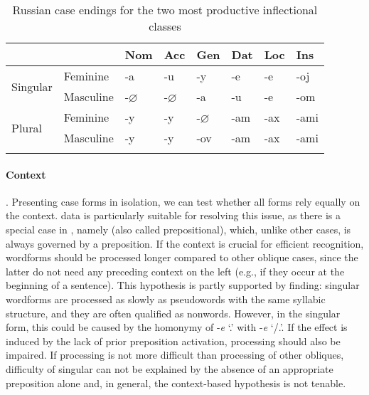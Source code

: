 \documentclass[output=paper, modfonts,newtxmath,hidelinks]{langscibook}
\begin{document}
\begin{table}
    \centering
	\caption{Russian case endings for the two most productive inflectional classes}
    \label{tab:rusDecl}
	\begin{tabular}{*{8}l}
		\lsptoprule
        ~	&	~	&	Nom    &	Acc	 & Gen  &	Dat &	Loc &	Ins	\\
        \midrule
		\multirow{2}{*}{Singular} & Feminine	&	-a  &	-u	&	-y	&	-e	& -e    &	-oj\\
		&	Masculine			&	-$\varnothing$  & -$\varnothing$    &	-a	&	-u	&   -e  &	-om	\\
        \midrule
        \multirow{2}{*}{Plural} & Feminine	& -y    & -y    &	-$\varnothing$ & -am  & -ax & -ami \\
        &	Masculine & -y  & -y &	-ov & -am    & -ax & -ami\\
		\lspbottomrule
    \end{tabular}
\end{table}

\paragraph*{Context}. Presenting case forms in isolation, we can test whether all  forms  rely equally on the context.  data is particularly suitable for resolving this issue, as there is a special case in , namely  (also called prepositional), which, unlike other cases, is always governed by a preposition. If the context is crucial for efficient  recognition,  wordforms should be processed longer compared to other oblique cases, since the latter do not need any preceding context on the left (e.g., if they occur at the beginning of a sentence). This hypothesis is partly supported by  finding:   singular wordforms are processed as slowly as pseudowords with the same syllabic structure, and they are often qualified as nonwords. However, in the singular form, this  could be caused by the homonymy of -\textit{e} `\locc.\masc' with  -\textit{e} `\datt/\locc.\fem'. If the effect is induced by the lack of prior preposition activation,   processing should also be impaired. If   processing is not more difficult than processing of other obliques, difficulty of   singular can not be explained by the absence of an appropriate preposition alone and, in general, the context-based hypothesis is not tenable. 
\end{document}
